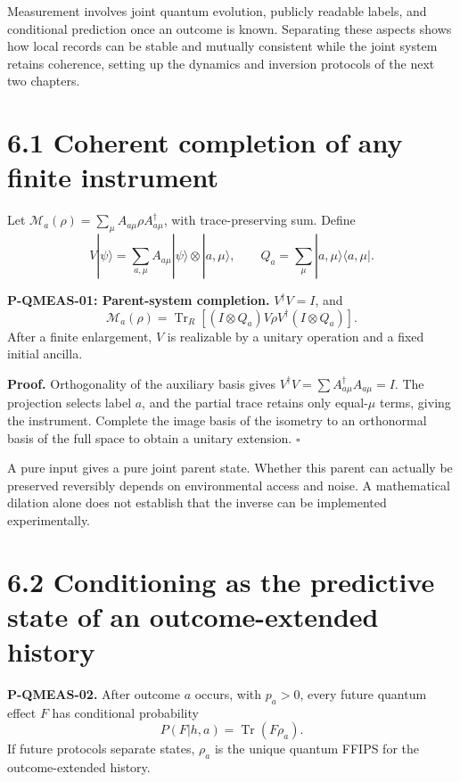 \documentclass[
  11pt,
  oneside]{book}
\begin{document}
Measurement involves joint quantum evolution, publicly readable labels,
and conditional prediction once an outcome is known. Separating these
aspects shows how local records can be stable and mutually consistent
while the joint system retains coherence, setting up the dynamics and
inversion protocols of the next two chapters.

\section{6.1 Coherent completion of any finite instrument}

Let \(\mathcal M_a(\rho)=\sum_\mu A_{a\mu}\rho A_{a\mu}^\dagger\), with
trace-preserving sum. Define \[
V|\psi\rangle=\sum_{a,\mu}A_{a\mu}|\psi\rangle\otimes|a,\mu\rangle,\qquad
Q_a=\sum_\mu|a,\mu\rangle\langle a,\mu|.
\]

\label{p-qmeas-01}{}

\textbf{P-QMEAS-01: Parent-system completion.} \(V^\dagger V=I\), and \[
\mathcal M_a(\rho)=
\operatorname{Tr}_R[(I\otimes Q_a)V\rho V^\dagger(I\otimes Q_a)].
\] After a finite enlargement, \(V\) is realizable by a unitary
operation and a fixed initial ancilla.

\textbf{Proof.} Orthogonality of the auxiliary basis gives
\(V^\dagger V=\sum A_{a\mu}^\dagger A_{a\mu}=I\). The projection selects
label \(a\), and the partial trace retains only equal-\(\mu\) terms,
giving the instrument. Complete the image basis of the isometry to an
orthonormal basis of the full space to obtain a unitary extension.
\(\square\)

A pure input gives a pure joint parent state. Whether this parent can
actually be preserved reversibly depends on environmental access and
noise. A mathematical dilation alone does not establish that the inverse
can be implemented experimentally.

\section{6.2 Conditioning as the predictive state of an outcome-extended
history}

\label{p-qmeas-02}{}

\textbf{P-QMEAS-02.} After outcome \(a\) occurs, with \(p_a>0\), every
future quantum effect \(F\) has conditional probability \[
P(F|h,a)=\operatorname{Tr}(F\rho_a).
\] If future protocols separate states, \(\rho_a\) is the unique quantum
FFIPS for the outcome-extended history.
\end{document}
